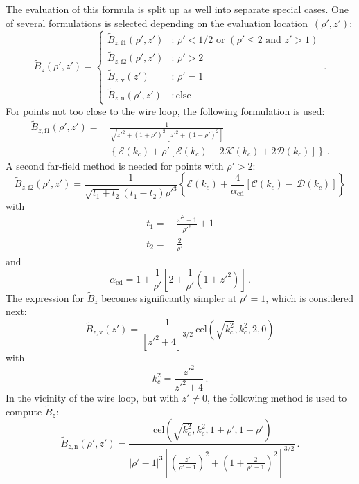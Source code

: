 The evaluation of this formula is split up as well into separate special cases.
One of several formulations is selected depending on the evaluation location~$(\rho', z')$:
\begin{equation}
  \tilde{B}_z(\rho', z')
  = \begin{cases}
      \tilde{B}_{z,\mathrm{f1}} (\rho', z') &:\, \rho' < 1/2 \textrm{ or } (\rho' \leq 2 \textrm{ and } z' > 1) \\
      \tilde{B}_{z,\mathrm{f2}} (\rho', z') &:\, \rho' > 2 \\
      \tilde{B}_{z,\mathrm{v}} (z') &:\, \rho' = 1 \\
      \tilde{B}_{z,\mathrm{n}} (\rho', z') &:\, \textrm{else}
    \end{cases} \label{eqn:cwl_B_z_switchover} \, .
\end{equation}
For points not too close to the wire loop, the following formulation is used:
\begin{align}
  \tilde{B}_{z,\mathrm{f1}} (\rho', z')
  =&\, \frac{1}{\sqrt{{z'}^2 + (1+\rho')^2} \left[{z'}^2 + (1 - \rho')^2 \right] } \nonumber \\
  ~&\,  \left\{ \mathcal{E}(k_c) + \rho' \left[ \mathcal{E}(k_c) - 2 \mathcal{K}(k_c) + 2 \mathcal{D}(k_c) \right] \right\} \, . \label{eqn:cwl_B_z_f1}
\end{align}
A second far-field method is needed for points with $\rho' > 2$:
\begin{equation}
  \tilde{B}_{z,\mathrm{f2}} (\rho', z')
  = \frac{1}{\sqrt{t_1 + t_2}(t_1-t_2) {\rho'}^3}
    \left\{ \mathcal{E}(k_c) + \frac{4}{\alpha_\mathrm{cd}} \left[ \mathcal{C}(k_c) - \,\mathcal{D}(k_c) \right] \right\} \label{eqn:cwl_B_z_f2}
\end{equation}
with
\begin{align}
  t_1 =&\, \frac{z'^2 + 1}{\rho'^2} + 1 \\
  t_2 =&\, \frac{2}{\rho'}
\end{align}
and
\begin{equation}
  \alpha_\mathrm{cd} = 1 + \frac{1}{\rho'} \left[ 2 + \frac{1}{\rho'} \left( 1 + {z'}^2 \right) \right] \, .
\end{equation}
The expression for $\tilde{B}_z$ becomes significantly simpler at $\rho'=1$,
which is considered next:
\begin{equation}
  \tilde{B}_{z,\mathrm{v}} (z')
  = \frac{1}{\left[ {z'}^2 + 4 \right]^{3/2}} \,\mathrm{cel}\left(\sqrt{k_c^2}, k_c^2, 2, 0 \right) \label{eqn:cwl_B_z_v}
\end{equation}
with
\begin{equation}
  k_c^2 = \frac{{z'}^2}{{z'}^2 + 4} \, .
\end{equation}
In the vicinity of the wire loop, but with $z' \neq 0$,
the following method is used to compute $\tilde{B}_z$:
\begin{equation}
  \tilde{B}_{z,\mathrm{n}} (\rho', z')
  = \frac{\,\mathrm{cel}\left( \sqrt{k_c^2}, k_c^2, 1 + \rho', 1 - \rho' \right) }
         {\left|\rho' - 1 \right|^3 \left[ \left( \frac{z'}{\rho'-1} \right)^2 + \left(1 + \frac{2}{\rho'-1} \right)^2 \right]^{3/2} } \, . \label{eqn:cwl_B_z_n}
\end{equation}

